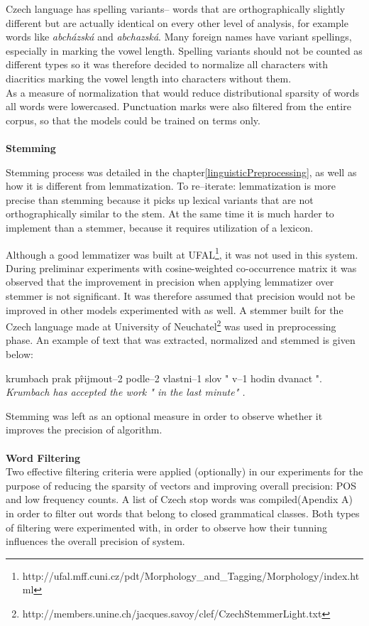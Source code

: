 Czech language has spelling variants-- words that are orthographically slightly different but are actually 
identical on every other level of analysis, for example words like \textit{abch\'azsk\'a}  and 
\textit{abchazsk\'a}. Many foreign names have variant spellings, especially in marking the vowel length. 
Spelling variants should not be counted as different types so it was therefore decided to normalize all 
characters with diacritics marking the vowel length into characters without them. 
\\As a measure of normalization that would reduce distributional sparsity of words all words were 
lowercased. Punctuation marks were also filtered from the entire corpus, so that the models could be 
trained on terms only. 
\\\\  \textbf{Stemming}

Stemming process was detailed in the chapter\ref{linguisticPreprocessing}, as well as how it is different 
from lemmatization. To re--iterate: lemmatization is more precise than stemming because it picks up 
lexical variants that are not orthographically similar to the stem. At the same time it is much harder to 
implement than a stemmer, because it requires utilization of a lexicon. 

Although a good lemmatizer was built at 
UFAL\footnote{http://ufal.mff.cuni.cz/pdt/Morphology\_and\_Tagging/Morphology/index.html}, it was not 
used 
in this system. During preliminar experiments with cosine-weighted co-occurrence matrix it was observed 
that the improvement in precision when applying lemmatizer over stemmer is not  significant. It was 
therefore
assumed that precision would not be improved in other models experimented with as well. 
A stemmer built for the Czech language made at University of 
Neuchatel\footnote{http://members.unine.ch/jacques.savoy/clef/CzechStemmerLight.txt} was used in 
preprocessing 
phase.  An example of text that 
was extracted, normalized and stemmed is given below:
\begin{examples}
\item krumbach prak p\^rijmout--2 podle--2 vlastni--1 slov " v--1 hodin dvanact ". 
\glt \textit{  Krumbach has accepted the work " in the last minute"  .} 
\end{examples}
Stemming was left as an optional measure in order to observe whether it improves the precision of algorithm.
\\\\  \textbf{Word Filtering}
\\Two effective filtering criteria were applied (optionally) in our experiments for the purpose of reducing the sparsity of vectors and improving overall precision: POS and low frequency counts. A list of Czech stop words was compiled(Apendix A) in order to filter out words that belong to closed grammatical classes. Both types of filtering were experimented with, in order to observe how their tunning influences the overall precision of system.


